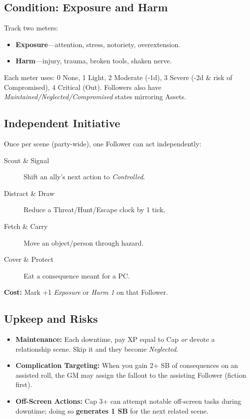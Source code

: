 \begin{multicols}{2}
\subsection*{Condition: Exposure and Harm}
Track two meters:
\begin{itemize}
  \item \textbf{Exposure}—attention, stress, notoriety, overextension.
  \item \textbf{Harm}—injury, trauma, broken tools, shaken nerve.
\end{itemize}
Each meter uses: 0 None, 1 Light, 2 Moderate (-1d), 3 Severe (-2d \& risk of Compromised), 4 Critical (Out). Followers also have \emph{Maintained/Neglected/Compromised} states mirroring Assets.

\subsection*{Independent Initiative}
Once per scene (party-wide), one Follower can act independently:
\begin{description}
  \item[Scout \& Signal] Shift an ally’s next action to \emph{Controlled}.
  \item[Distract \& Draw] Reduce a Threat/Hunt/Escape clock by 1 tick.
  \item[Fetch \& Carry] Move an object/person through hazard.
  \item[Cover \& Protect] Eat a consequence meant for a PC.
\end{description}
\textbf{Cost:} Mark +1 \emph{Exposure} or \emph{Harm 1} on that Follower.

\subsection*{Upkeep and Risks}
\begin{itemize}
  \item \textbf{Maintenance:} Each downtime, pay XP equal to Cap \emph{or} devote a relationship scene. Skip it and they become \emph{Neglected}.
  \item \textbf{Complication Targeting:} When you gain 2+ SB of consequences on an assisted roll, the GM may assign the fallout to the assisting Follower (fiction first).
  \item \textbf{Off-Screen Actions:} Cap 3+ can attempt notable off-screen tasks during downtime; doing so \textbf{generates 1 SB} for the next related scene.
\end{itemize}


\end{multicols}

